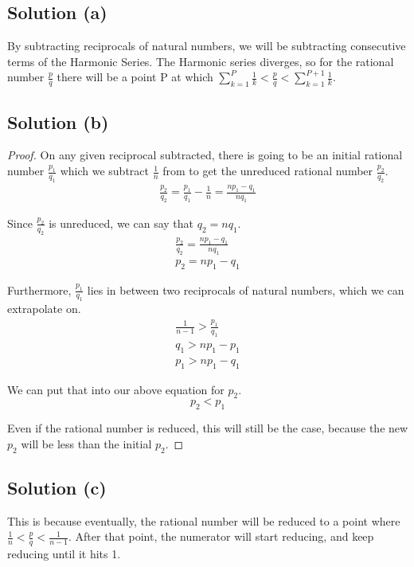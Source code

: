 \documentclass[12pt]{report}
\begin{document}
    \subsection{Solution (a)}
        By subtracting reciprocals of natural numbers, we will be subtracting consecutive terms of the Harmonic Series.
        The Harmonic series diverges, so for the rational number $\frac{p}{q}$ there will be a point P at which $\sum_{k=1}^{P} \frac{1}{k} < \frac{p}{q} < \sum_{k=1}^{P+1} \frac{1}{k}$.

    \subsection{Solution (b)}
        \begin{proof}
            On any given reciprocal subtracted, there is going to be an initial rational number $\frac{p_1}{q_1}$ which we subtract $\frac{1}{n}$ from to get the unreduced rational number $\frac{p_2}{q_2}$.
            \begin{gather}
                \frac{p_2}{q_2} = \frac{p_1}{q_1} - \frac{1}{n}
                    =   \frac{np_1 - q_1}{nq_1}
            \end{gather}

            Since $\frac{p_2}{q_2}$ is unreduced, we can say that $q_2 = n q_1$.
            \begin{gather}
                \frac{p_2}{q_2} = \frac{np_1 - q_1}{nq_1}\\
                p_2 = np_1 - q_1
            \end{gather}

            Furthermore, $\frac{p_1}{q_1}$ lies in between two reciprocals of natural numbers, which we can extrapolate on.
            \begin{gather}
                \frac{1}{n-1} > \frac{p_1}{q_1}\\
                q_1 > n p_1 - p_1\\
                p_1 > n p_1 - q_1
            \end{gather}

            We can put that into our above equation for $p_2$.
            \begin{equation}
                p_2 < p_1
            \end{equation}

            Even if the rational number is reduced, this will still be the case, because the new $p_2$ will be less than the initial $p_2$.
        \end{proof}

    \subsection{Solution (c)}
        This is because eventually, the rational number will be reduced to a point where $\frac{1}{n} < \frac{p}{q} < \frac{1}{n - 1}$.
        After that point, the numerator will start reducing, and keep reducing until it hits 1.
\end{document}

